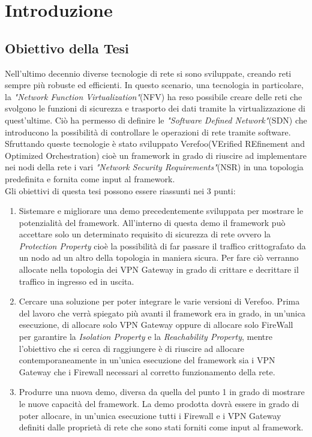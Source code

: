 

\hypersetup{
    colorlinks=true,
    linkcolor=blue
}

\chapter{Introduzione} \label{ch:intro}

\section{Obiettivo della Tesi} 

Nell'ultimo decennio diverse tecnologie di rete si sono sviluppate,
creando reti sempre più robuste ed efficienti. In questo scenario,
una tecnologia in particolare, la \textit{"Network Function Virtualization"}(NFV)
ha reso possibile creare delle reti che svolgono le funzioni di sicurezza e
trasporto dei dati tramite la virtualizzazione di quest'ultime. Ciò ha permesso di definire
le \textit{"Software Defined Network"}(SDN) che introducono la possibilità di controllare le operazioni di rete
 tramite software.\\
Sfruttando queste tecnologie è stato sviluppato Verefoo(VErified REfinement and Optimized Orchestration) cioè 
un framework in grado di riuscire ad implementare nei nodi della rete i vari \textit{"Network Security Requirements"}(NSR) in una topologia predefinita e fornita
come input al framework.\\
Gli obiettivi di questa tesi possono essere riassunti nei 3 punti:

\begin{enumerate}
    \item Sistemare e migliorare una demo precedentemente sviluppata per mostrare le potenzialità del framework.
        All'interno di questa demo il framework può accettare solo un determinato requisito di sicurezza di rete ovvero
        la \textit{Protection Property} cioè la possibilità di far passare il traffico crittografato da un nodo ad un altro della topologia
        in maniera sicura. Per fare ciò verranno allocate nella topologia dei VPN Gateway in grado di crittare e decrittare il traffico in ingresso ed in uscita.
    \item Cercare una soluzione per poter integrare le varie versioni di Verefoo. Prima del lavoro che verrà spiegato più avanti il framework era in grado, in un'unica 
        esecuzione, di allocare solo VPN Gateway oppure di allocare solo FireWall per garantire la \textit{Isolation Property} e la \textit{Reachability Property}, mentre
        l'obiettivo che si cerca di raggiungere è di riuscire ad allocare contemporaneamente in un'unica esecuzione del framework sia i VPN Gateway che i Firewall necessari
        al corretto funzionamento della rete.
    \item Produrre una nuova demo, diversa da quella del punto 1 in grado di mostrare le nuove capacità del framework. La demo prodotta dovrà essere in grado di poter allocare,
        in un'unica esecuzione tutti i Firewall e i VPN Gateway definiti dalle proprietà di rete che sono stati forniti come input al framework.
\end{enumerate}


